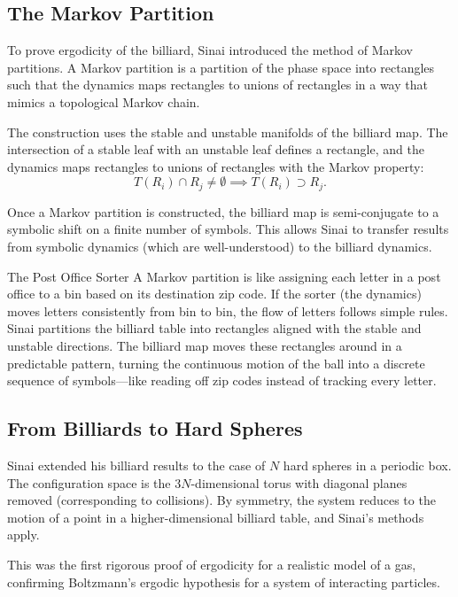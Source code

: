 \subsection{The Markov Partition}

To prove ergodicity of the billiard, Sinai introduced the method of Markov partitions. A Markov partition is a partition of the phase space into rectangles such that the dynamics maps rectangles to unions of rectangles in a way that mimics a topological Markov chain.

The construction uses the stable and unstable manifolds of the billiard map. The intersection of a stable leaf with an unstable leaf defines a rectangle, and the dynamics maps rectangles to unions of rectangles with the Markov property:
\[
 T(R_i) \cap R_j \neq \emptyset \implies T(R_i) \supset R_j.
\]

Once a Markov partition is constructed, the billiard map is semi-conjugate to a symbolic shift on a finite number of symbols. This allows Sinai to transfer results from symbolic dynamics (which are well-understood) to the billiard dynamics.

\begin{analogy}{The Post Office Sorter}
A Markov partition is like assigning each letter in a post office to a bin based on its destination zip code. If the sorter (the dynamics) moves letters consistently from bin to bin, the flow of letters follows simple rules. Sinai partitions the billiard table into rectangles aligned with the stable and unstable directions. The billiard map moves these rectangles around in a predictable pattern, turning the continuous motion of the ball into a discrete sequence of symbols---like reading off zip codes instead of tracking every letter.
\end{analogy}

\subsection{From Billiards to Hard Spheres}

Sinai extended his billiard results to the case of $N$ hard spheres in a periodic box. The configuration space is the $3N$-dimensional torus with diagonal planes removed (corresponding to collisions). By symmetry, the system reduces to the motion of a point in a higher-dimensional billiard table, and Sinai's methods apply.

This was the first rigorous proof of ergodicity for a realistic model of a gas, confirming Boltzmann's ergodic hypothesis for a system of interacting particles.

